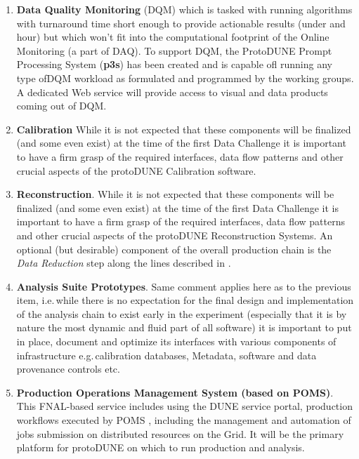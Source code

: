 \documentclass[pdftex,12pt,letter]{article}
\newcommand{\pd}{protoDUNE\xspace}
\begin{document}
\begin{enumerate}
\item \textbf{Data Quality Monitoring} (DQM) which is tasked with running algorithms with turnaround time short enough to provide
actionable results (under and hour) but which won't fit into the computational footprint of the Online Monitoring (a part of DAQ).
To support DQM, the ProtoDUNE Prompt Processing System (\textbf{p3s}) \cite{docdb1811,p3s} has been created and
is capable ofl running any type ofDQM workload as formulated and programmed by the working groups. A dedicated Web
service will provide access to visual and data products coming out of DQM.

\item \textbf{Calibration} While it is not expected that these components will be finalized
(and some even exist) at the time of the first Data Challenge it is important to have a firm grasp of the required interfaces,
data flow patterns and other crucial aspects of the \pd Calibration software.
 \item \textbf{Reconstruction}. While it is not expected that these components will be finalized
(and some even exist) at the time of the first Data Challenge it is important to have a firm grasp of the required interfaces,
data flow patterns and other crucial aspects of the \pd Reconstruction Systems.
An optional (but desirable)  component of the overall production chain is the \textit{Data Reduction} step along the lines described
in \cite{docdb2089}.

\item \textbf{Analysis Suite Prototypes}. Same comment applies here as to the previous item, i.e.\,while there is no expectation
for the final design and implementation of the analysis chain to exist early in the experiment (especially that it is by nature the most
dynamic and fluid part of all software) it is important to put in place, document and optimize its interfaces with various components
of infrastructure e.g.\,calibration databases, Metadata, software and data provenance controls etc.

\item \textbf{Production Operations Management System (based on POMS)}. This FNAL-based service includes using the DUNE service portal, production workflows executed by POMS \cite{poms}, including the management and automation of  jobs
submission on distributed resources on the Grid. It will be the primary platform for \pd on which to run production and analysis.


\end{enumerate}
\end{document}
